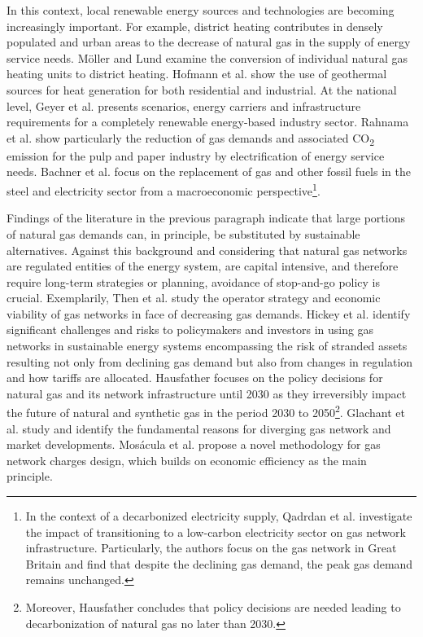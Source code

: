 In this context, local renewable energy sources and technologies are becoming increasingly important. For example, district heating contributes in densely populated and urban areas to the decrease of natural gas in the supply of energy service needs. Möller and Lund \cite{moller2010conversion} examine the conversion of individual natural gas heating units to district heating. Hofmann et al. \cite{hofmann2014potential} show the use of geothermal sources for heat generation for both residential and industrial. At the national level, Geyer et al. \cite{geyer2021100} presents scenarios, energy carriers and infrastructure requirements for a completely renewable energy-based industry sector. Rahnama et al. \cite{rahnama2021pulp} show particularly the reduction of gas demands and associated CO\textsubscript{2} emission for the pulp and paper industry by electrification of energy service needs. Bachner \cite{bachner2020risk} et al. focus on the replacement of gas and other fossil fuels in the steel and electricity sector from a macroeconomic perspective\footnote{In the context of a decarbonized electricity supply, Qadrdan et al. \cite{qadrdan2015impact} investigate the impact of transitioning to a low-carbon electricity sector on gas network infrastructure. Particularly, the authors focus on the gas network in Great Britain and find that despite the declining gas demand, the peak gas demand remains unchanged.}.\vspace{0.35cm}

Findings of the literature in the previous paragraph indicate that large portions of natural gas demands can, in principle, be substituted by sustainable alternatives. Against this background and considering that natural gas networks are regulated entities of the energy system, are capital intensive, and therefore require long-term strategies or planning, avoidance of stop-and-go policy is crucial. Exemplarily, Then et al. \cite{then2020impact} study the operator strategy and economic viability of gas networks in face of decreasing gas demands. Hickey et al. \cite{hickey2019there} identify significant challenges and risks to policymakers and investors in using gas networks in sustainable energy systems encompassing the risk of stranded assets resulting not only from declining gas demand but also from changes in regulation and how tariffs are allocated. Hausfather \cite{hausfather2015bounding} focuses on the policy decisions for natural gas and its network infrastructure until 2030 as they irreversibly impact the future of natural and synthetic gas in the period 2030 to 2050\footnote{Moreover, Hausfather concludes that policy decisions are needed leading to decarbonization of natural gas no later than 2030.}. Glachant et al. \cite{glachant2014gas} study and identify the fundamental reasons for diverging gas network and market developments. Mos{\'a}cula et al. \cite{mosacula2018designing} propose a novel methodology for gas network charges design, which builds on economic efficiency as the main principle.\vspace{0.3cm}

